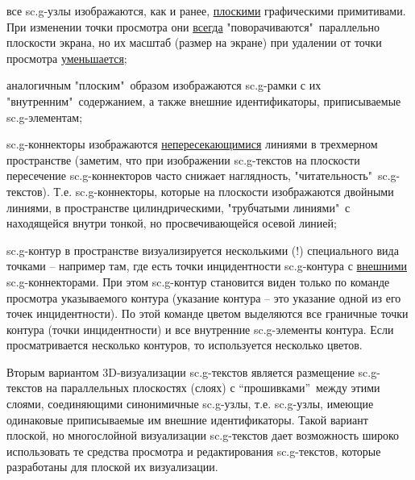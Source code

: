 \begin{SCn}
{\begin{scnitemize}
\item все sc.g-узлы изображаются, как и ранее, \uline{плоскими} графическими примитивами. При изменении точки просмотра они \uline{всегда} "поворачиваются"\ параллельно плоскости экрана, но их масштаб (размер на экране) при удалении от  точки просмотра \uline{уменьшается};
\item аналогичным "плоским"\ образом изображаются sc.g-рамки с их "внутренним"\ содержанием, а также внешние идентификаторы, приписываемые sc.g-элементам;
\item sc.g-коннекторы изображаются \uline{непересекающимися} линиями в трехмерном пространстве (заметим, что при изображении sc.g-текстов на плоскости пересечение sc.g-коннекторов часто снижает наглядность, "читательность"\ sc.g-текстов). Т.е. sc.g-коннекторы, которые на плоскости изображаются двойными линиями, в пространстве  цилиндрическими, "трубчатыми линиями"\ с находящейся внутри тонкой, но просвечивающейся осевой линией;
\item sc.g-контур в пространстве визуализируется несколькими (!) специального вида точками -- например там, где есть точки инцидентности sc.g-контура с \uline{внешними} sc.g-коннекторами. При этом sc.g-контур становится виден только по команде просмотра указываемого контура (указание контура – это указание одной из его точек инцидентности). По этой команде цветом выделяются все граничные точки контура (точки инцидентности) и все внутренние sc.g-элементы контура. Если просматривается  несколько контуров, то используется несколько цветов.
\end{scnitemize}

Вторым вариантом 3D-визуализации sc.g-текстов является размещение sc.g-текстов на параллельных плоскостях (слоях) с “прошивками”\ между этими слоями, соединяющими синонимичные sc.g-узлы, т.е. sc.g-узлы, имеющие одинаковые приписываемые им внешние идентификаторы. Такой вариант плоской, но многослойной визуализации sc.g-текстов дает возможность широко использовать те средства просмотра и редактирования sc.g-текстов, которые разработаны для плоской их визуализации.}

\scnendstruct


\scnstartsubstruct

\bigskip
{}
\end{SCn}
